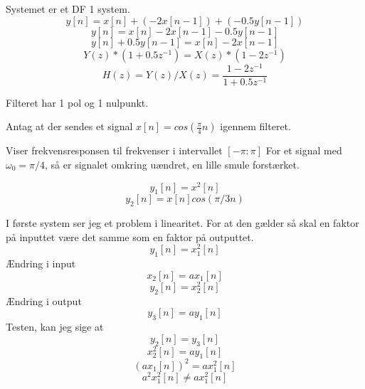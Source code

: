 \begin{EksamensOpgaver}
\begin{Eksamenssæt}[2022]
\begin{eksamensOpgave}
\begin{UnderOpgave}
            
        \end{UnderOpgave}

        \end{eksamensOpgave}
        \begin{eksamensOpgave}
            \begin{UnderOpgave}
                Systemet er et DF 1 system. 
                \[y[n] = x[n] + (-2x[n - 1]) + (-0.5y[n - 1])\]
                \[y[n] = x[n] - 2x[n - 1] - 0.5y[n - 1]\]
                \[y[n] + 0.5y[n - 1]= x[n] - 2x[n - 1]\]
                \[Y(z) * (1 + 0.5z^{-1}) = X(z) * (1 - 2z^{-1})\]
                \[H(z) = Y(z)/X(z) = \frac{1 - 2z^{-1}}{1 + 0.5z^{-1}}\]            
            \end{UnderOpgave}
            \begin{UnderOpgave}
                Filteret har 1 pol og 1 nulpunkt.             
            \end{UnderOpgave}
            Antag at der sendes et signal $x[n] = cos(\frac{\pi}{4} n)$ igennem filteret. 
            \begin{UnderOpgave}
                Viser frekvensresponsen til frekvenser i intervallet $[-\pi: \pi]$
                For et signal med $\omega_0 = \pi/4$, så er signalet omkring uændret, en lille smule forstærket.
            \end{UnderOpgave}
        \end{eksamensOpgave}
        \begin{eksamensOpgave}
            \[y_1[n] = x^2[n]\]
            \[y_2[n] = x[n]cos(\pi/3 n)\]
            \begin{UnderOpgave}
                I første system ser jeg et problem i linearitet. 
                For at den gælder så skal en faktor på inputtet være det samme som en faktor på outputtet.
                \[y_1[n] = x_1^2[n]\]
                Ændring i input
                \[x_2[n] = ax_1[n]\] 
                \[y_2[n] = x_2^2[n]\]
                Ændring i output
                \[y_3[n] = ay_1[n]\]
                Testen, kan jeg sige at
                \[y_2[n] = y_3[n]\] 
                \[x_2^2[n] = ay_1[n]\] 
                \[(ax_1[n])^2 = ax_1^2[n]\] 
                \[a^2x_1^2[n] \neq ax_1^2[n]\] 

\end{UnderOpgave}
\end{eksamensOpgave}
\end{Eksamenssæt}
\end{EksamensOpgaver}
